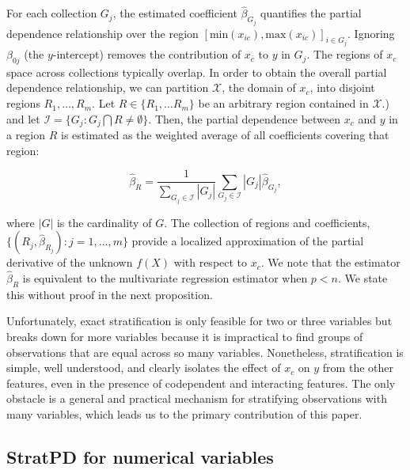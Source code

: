 \documentclass[12pt]{article}
\newcommand{\xnc}{$x_{\overline{c}}$}
\begin{document}
For each collection $G_j$, the estimated coefficient $\widehat{\beta}_{G_j}$ quantifies the partial dependence relationship over the region $[\text{min}(x_{ic}), \text{max}(x_{ic})]_{i \in G_j}$. Ignoring $\beta_{0j}$ (the $y$-intercept) removes the contribution of \xnc{} to $y$ in $G_j$. The regions of $x_c$ space across collections typically overlap.  In order to obtain the overall partial dependence relationship, we can partition $\mathcal{X}$, the domain of $x_c$, into disjoint regions $R_1, \ldots, R_m$. Let $R \in \{R_1, \ldots R_m\}$ be an arbitrary region contained in $\mathcal{X}.$) and let $\mathcal{I} = \{G_j: G_j \bigcap R \neq \emptyset\}$. Then, the partial dependence between $x_c$ and $y$ in a region $R$ is estimated as the weighted average of all coefficients covering that region: 

\begin{equation}\label{eq:truebeta}
	\widehat{\beta}_R = \dfrac{1}{\displaystyle\sum_{G_j \in \mathcal{I}} |G_j|}\displaystyle\sum_{G_j \in \mathcal{I}}|G_j|\widehat{\beta}_{G_j},
\end{equation}

\noindent where $|G|$ is the cardinality of $G$. The collection of regions and coefficients, $\{(R_j, \widehat{\beta}_{R_j}): j = 1, \ldots, m\}$ provide a localized approximation of the partial derivative of the unknown $f(X)$ with respect to $x_c$. {\color{red} We note that the estimator $\widehat{\beta}_R$ is equivalent to the multivariate regression estimator when $p < n$. We state this without proof in the next proposition}. 

Unfortunately, exact stratification is only feasible for two or three variables but breaks down for more variables because it is impractical to find groups of observations that are equal across so many variables.  Nonetheless, stratification is simple, well understood, and clearly isolates the effect of $x_c$ on $y$ from the other features, even in the presence of codependent and interacting features. The only obstacle is a general and practical mechanism for stratifying observations with many variables, which leads us to the primary contribution of this paper.

\subsection{StratPD for numerical variables}\label{sec:numerical}
\end{document}
